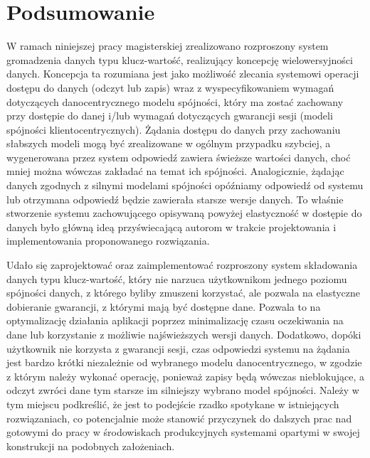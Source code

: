 \chapter{Podsumowanie} \label{chapter:summary}

W ramach niniejszej pracy magisterskiej zrealizowano rozproszony system gromadzenia danych typu klucz-wartość, realizujący koncepcję wielowersyjności danych. Koncepcja ta rozumiana jest jako możliwość zlecania systemowi operacji dostępu do danych (odczyt lub zapis) wraz z wyspecyfikowaniem wymagań dotyczących danocentrycznego modelu spójności, który ma zostać zachowany przy dostępie do danej i/lub wymagań dotyczących gwarancji sesji (modeli spójności klientocentrycznych). Żądania dostępu do danych przy zachowaniu słabszych modeli mogą być zrealizowane w ogólnym przypadku szybciej, a wygenerowana przez system odpowiedź zawiera świeższe wartości danych, choć mniej można wówczas zakładać na temat ich spójności. Analogicznie, żądając danych zgodnych z silnymi modelami spójności opóźniamy odpowiedź od systemu lub otrzymana odpowiedź będzie zawierała starsze wersje danych. To właśnie stworzenie systemu zachowującego opisywaną powyżej elastyczność w dostępie do danych było główną ideą przyświecającą autorom w trakcie projektowania i implementowania proponowanego rozwiązania. 

Udało się zaprojektować oraz zaimplementować rozproszony system składowania danych typu klucz-wartość, który nie narzuca użytkownikom jednego poziomu spójności danych, z którego byliby zmuszeni korzystać, ale pozwala na elastyczne dobieranie gwarancji, z którymi mają być dostępne dane. Pozwala to na optymalizację działania aplikacji poprzez minimalizację czasu oczekiwania na dane lub korzystanie z możliwie najświeższych wersji danych. Dodatkowo, dopóki użytkownik nie korzysta z gwarancji sesji, czas odpowiedzi systemu na żądania jest bardzo krótki niezależnie od wybranego modelu danocentrycznego, w zgodzie z którym należy wykonać operację, ponieważ zapisy będą wówczas nieblokujące, a odczyt zwróci dane tym starsze im silniejszy wybrano model spójności. Należy w tym miejscu podkreślić, że jest to podejście rzadko spotykane w istniejących rozwiązaniach, co potencjalnie może stanowić przyczynek do dalszych prac nad gotowymi do pracy w środowiskach produkcyjnych systemami opartymi w swojej konstrukcji na podobnych założeniach.

